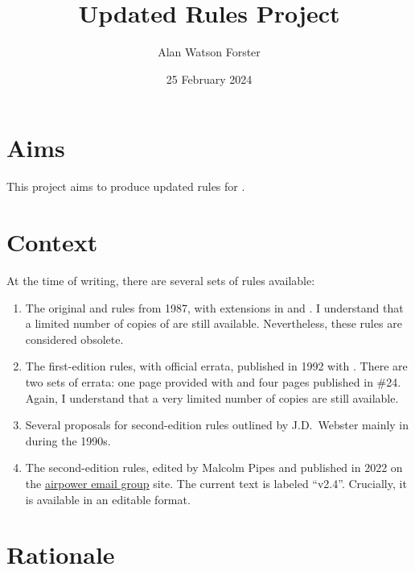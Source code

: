 \documentclass[10pt]{article}
\title{Updated Rules Project}
\author{Alan Watson Forster}
\date{25 February 2024}
\begin{document}
\twocolumn
\thispagestyle{empty}
\maketitle
\suppressfloats

\section*{Aims}

This project aims to produce updated rules for {\AirPow}.

\section*{Context}

At the time of writing, there are several sets of rules available:
\begin{enumerate}
    \item The original {\AirSup} and {\AirStr} rules from 1987, with extensions in {\DF} and {\EOTG}. I understand that a limited number of copies of {\AirSup} are still available. Nevertheless, these rules are considered obsolete.
    \item The first-edition {\AirPow} rules, with official errata, published in 1992 with {\TSOH}. There are two sets of errata: one page provided with {\TSOH} and four pages published in {\APJ} \#24. Again, I understand that a very limited number of copies are still available.
    \item Several proposals for second-edition rules outlined by J.D.\ Webster mainly in {\APJ} during the 1990s.
    \item The second-edition {\AirPow} rules, edited by Malcolm Pipes and published in 2022 on the \href{https://airpower.groups.io/g/main}{airpower email group} site. The current text is labeled “v2.4”. Crucially, it is available in an editable format.
\end{enumerate}

\section*{Rationale}
\end{document}
